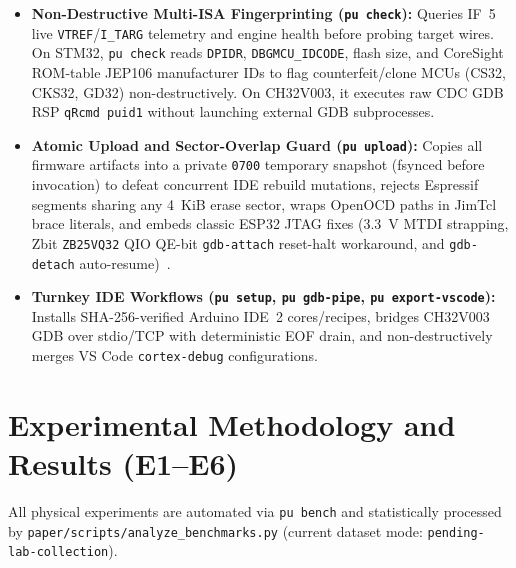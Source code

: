 \documentclass[journal]{IEEEtran}
\newcommand{\BenchDatasetMode}{pending-lab-collection}%
\begin{document}
\begin{itemize}
  \item \textbf{Non-Destructive Multi-ISA Fingerprinting (\texttt{pu check}):} Queries IF~5 live \texttt{VTREF}/\texttt{I\_TARG} telemetry and engine health before probing target wires. On STM32, \texttt{pu check} reads \texttt{DPIDR}, \texttt{DBGMCU\_IDCODE}, flash size, and CoreSight ROM-table JEP106 manufacturer IDs to flag counterfeit/clone MCUs (CS32, CKS32, GD32) non-destructively. On CH32V003, it executes raw CDC GDB RSP \texttt{qRcmd puid1} without launching external GDB subprocesses.
  \item \textbf{Atomic Upload and Sector-Overlap Guard (\texttt{pu upload}):} Copies all firmware artifacts into a private \texttt{0700} temporary snapshot (fsynced before invocation) to defeat concurrent IDE rebuild mutations, rejects Espressif segments sharing any 4~KiB erase sector, wraps OpenOCD paths in JimTcl brace literals, and embeds classic ESP32 JTAG fixes (3.3~V MTDI strapping, Zbit \texttt{ZB25VQ32} QIO QE-bit \texttt{gdb-attach} reset-halt workaround, and \texttt{gdb-detach} auto-resume)~\cite{openocd_docs}.
  \item \textbf{Turnkey IDE Workflows (\texttt{pu setup}, \texttt{pu gdb-pipe}, \texttt{pu export-vscode}):} Installs SHA-256-verified Arduino IDE~2 cores/recipes, bridges CH32V003 GDB over stdio/TCP with deterministic EOF drain, and non-destructively merges VS Code \texttt{cortex-debug} configurations.
\end{itemize}

\section{Experimental Methodology and Results (E1--E6)}
\label{sec:eval}
All physical experiments are automated via \texttt{pu bench} and statistically processed by \texttt{paper/scripts/analyze\_benchmarks.py} (current dataset mode: \texttt{\BenchDatasetMode}).
\end{document}
